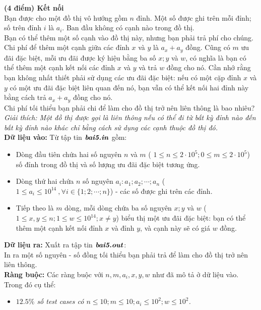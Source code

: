 \begin{ex}
	\textbf{(4 điểm) Kết nối}\\
	Bạn được cho một đồ thị vô hướng gồm $n$ đỉnh. Một số được ghi trên mỗi đỉnh; số trên đỉnh $i$ là $a_i$. Ban đầu không có cạnh nào trong đồ thị. \\
	Bạn có thể thêm một số cạnh vào đồ thị này, nhưng bạn phải trả phí cho chúng. Chi phí để thêm một cạnh giữa các đỉnh $x$ và $y$ là $a_x+a_y$ đồng. Cũng có $m$ ưu đãi đặc biệt, mỗi ưu đãi được ký hiệu bằng ba số $x;y$ và $w$, có nghĩa là bạn có thể thêm một cạnh kết nối các đỉnh $x$ và $y$ và trả $w$ đồng cho nó. Cần nhớ rằng bạn không nhất thiết phải sử dụng các ưu đãi đặc biệt: nếu có một cặp đỉnh $x$ và $y$ có một ưu đãi đặc biệt liên quan đến nó, bạn vẫn có thể kết nối hai đỉnh này bằng cách trả $a_x+a_y$ đồng cho nó. \\
	Chi phí tối thiểu bạn phải chi để làm cho đồ thị trở nên liên thông là bao nhiêu?
	\textit{Giải thích: Một đồ thị được gọi là liên thông nếu có thể đi từ bất kỳ đỉnh nào đến bất kỳ đỉnh nào khác chỉ bằng cách sử dụng các cạnh thuộc đồ thị đó.}\\
	\textbf{Dữ liệu vào: } Từ tập tin $\textbf{\textit{bai5.in}}$ gồm: 
	\begin{itemize}
		\item Dòng đầu tiên chứa hai số nguyên $n$ và $m$ ( $1 \leq n \leq 2\cdot 10^5; 0 \leq m \leq 2\cdot 10^5$) số đỉnh trong đồ thị và số lượng ưu đãi đặc biệt tương ứng. 
		\item Dòng thứ hai chứa $n$ số nguyên $a_i: a_1; a_2; \cdots ; a_n$ ($ 1 \leq a_i \leq 10^{14} ~, \forall i \in \{1; 2; \cdots; n\}$) - các số được ghi trên các đỉnh. 
		\item Tiếp theo là $m$ dòng, mỗi dòng chứa ba số nguyên $x;y$ và $w$ ($1 \leq x, y \leq n ; 1 \leq w \leq 10^{14}; x \ne y$) biểu thị một ưu đãi đặc biệt: bạn có thể thêm một cạnh kết nối đỉnh $x$ và đỉnh $y$, và cạnh này sẽ có giá $w$ đồng. 
	\end{itemize}
	\textbf{Dữ liệu ra: } Xuất ra tập tin $\textbf{\textit{bai5.out}}$: \\
	In ra một số nguyên - số đồng tối thiểu bạn phải trả để làm cho đồ thị trở nên liên thông.\\
	\textbf{Ràng buộc: } Các ràng buộc với $n,m,a_i, x,y,w$ như đã mô tả ở dữ liệu vào.	Trong đó cụ thể:
	\begin{itemize}
		\item \textit{$12.5\%$ số test cases có $n \leq 10; m \leq 10; a_i \leq 10^2 ; w \leq 10^2$.}

\end{itemize}
\end{ex}
